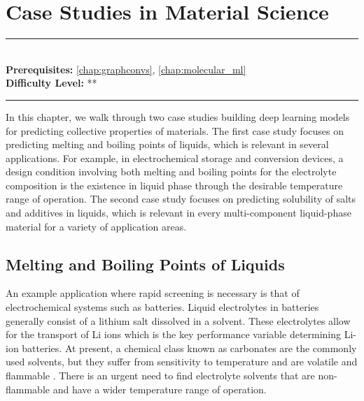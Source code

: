 \documentclass[book.tex]{subfiles}
\begin{document}
\chapter{Case Studies in Material Science}

\label{ch:ml_ms}
\noindent\rule{11cm}{0.4pt} \\
\textbf{Prerequisites:} \autoref{chap:graphconvs}, \autoref{chap:molecular_ml}   \\
\textbf{Difficulty Level:} ** \\
\noindent\rule{11cm}{0.4pt}
\vspace{5mm}

In this chapter, we walk through two case studies building deep learning models for predicting collective properties of materials. The first case study focuses on predicting melting and boiling points of liquids, which is relevant in several applications. For example, in electrochemical storage and conversion devices, a design condition involving both melting and boiling points for the electrolyte composition is the existence in liquid phase through the desirable temperature range of operation. The second case study focuses on predicting solubility of salts and additives in liquids, which is relevant in every multi-component liquid-phase material for a variety of application areas.

\section{Melting and Boiling Points of Liquids}

An example application where rapid screening is necessary is that of electrochemical systems such as batteries. Liquid electrolytes in batteries generally consist of a lithium salt dissolved in a solvent. These electrolytes allow for the transport of Li ions which is the key performance variable determining Li-ion batteries. At present, a chemical class known as carbonates are the commonly used solvents, but they suffer from sensitivity to temperature and are volatile and flammable \cite{Yamada2019AdvancesElectrolytes}.  There is an urgent need to find electrolyte solvents that are non-flammable and have a wider temperature range of operation.
\end{document}
